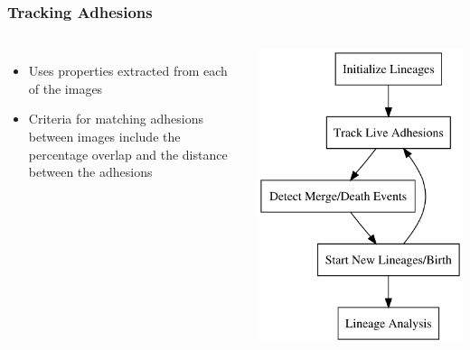\documentclass{beamer}
\begin{document}
\begin{frame}
	\frametitle{Tracking Adhesions}
	\begin{columns}
	\begin{itemize}
	\item Uses properties extracted from each of the images
	\item Criteria for matching adhesions between images include the percentage
	overlap and the distance between the adhesions
	\end{itemize}
	\includegraphics[width=\textwidth]{figures/finding/tracking_flowchart}
	\end{columns}
\end{frame}
\end{document}
